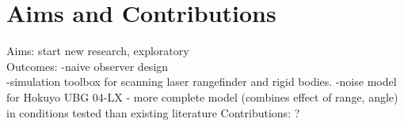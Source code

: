 \chapter*{Aims and Contributions}

Aims: start new research, exploratory\\
Outcomes:
-naive observer design\\
-simulation toolbox for scanning laser rangefinder and rigid bodies.
-noise model for Hokuyo UBG 04-LX - more complete model (combines effect of range, angle) in conditions tested than existing literature
Contributions: ?